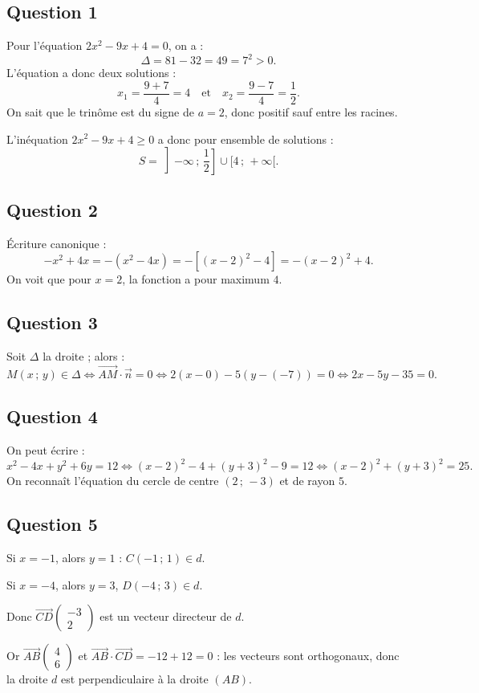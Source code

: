 \subsection*{Question 1}

Pour l'équation \(2x^2 - 9x + 4 = 0\), on a :
\[
\Delta = 81 - 32 = 49 = 7^2 > 0.
\]
L'équation a donc deux solutions :
\[
x_1 = \dfrac{9 + 7}{4} = 4 \quad \text{et} \quad x_2 = \dfrac{9 - 7}{4} = \dfrac{1}{2}.
\]
On sait que le trinôme est du signe de \(a = 2\), donc positif sauf entre les racines.

L'inéquation \(2x^2 - 9x + 4 \geqslant 0\) a donc pour ensemble de solutions :
\[
S = \left] -\infty\,;\,\dfrac{1}{2} \right] \cup [4\,;\,+\infty[.
\]

\subsection*{Question 2}

Écriture canonique :
\[
-x^2 + 4x = -(x^2 - 4x) = -[(x - 2)^2 - 4] = -(x - 2)^2 + 4.
\]
On voit que pour \(x = 2\), la fonction a pour maximum \(4\).

\subsection*{Question 3}

Soit \(\Delta\) la droite ; alors :
\[
M(x\,;\,y) \in \Delta \Longleftrightarrow \overrightarrow{AM} \cdot \vec{n} = 0 \Longleftrightarrow 2(x - 0) - 5(y - (-7)) = 0 \Longleftrightarrow 2x - 5y - 35 = 0.
\]

\subsection*{Question 4}

On peut écrire :
\[
x^2 - 4x + y^2 + 6y = 12 \Longleftrightarrow (x - 2)^2 - 4 + (y + 3)^2 - 9 = 12 \Longleftrightarrow (x - 2)^2 + (y + 3)^2 = 25.
\]
On reconnaît l'équation du cercle de centre \((2\,;\,-3)\) et de rayon \(5\).

\subsection*{Question 5}

Si \(x = -1\), alors \(y = 1\) : \(C(-1\,;\,1) \in d\).

Si \(x = -4\), alors \(y = 3\), \(D(-4\,;\,3) \in d\).

Donc \(\overrightarrow{CD} \begin{pmatrix} -3 \\ 2 \end{pmatrix}\) est un vecteur directeur de \(d\).

Or \(\overrightarrow{AB} \begin{pmatrix} 4 \\ 6 \end{pmatrix}\) et \(\overrightarrow{AB} \cdot \overrightarrow{CD} = -12 + 12 = 0\) : les vecteurs sont orthogonaux, donc la droite \(d\) est perpendiculaire à la droite \((AB)\).
